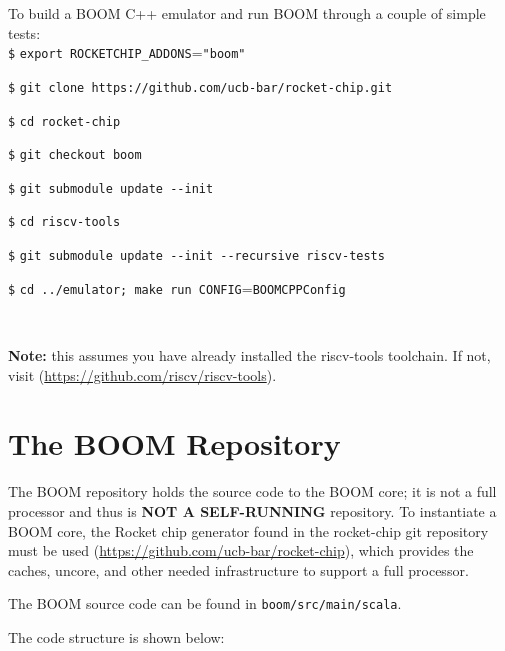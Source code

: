To build a BOOM C++ emulator and run BOOM through a couple of simple tests:
\\

\texttt{\$} \verb=export ROCKETCHIP_ADDONS==\verb="boom"=

\texttt{\$} \verb=git clone https://github.com/ucb-bar/rocket-chip.git=

\texttt{\$} \verb=cd rocket-chip=

\texttt{\$} \verb=git checkout boom=

\texttt{\$} \verb=git submodule update --init=

\texttt{\$} \verb=cd riscv-tools=

\texttt{\$} \verb=git submodule update --init --recursive riscv-tests=

\texttt{\$} \verb=cd ../emulator; make run CONFIG==\verb=BOOMCPPConfig=

\

{\bf Note:} this assumes you have already installed the riscv-tools toolchain.  If not, visit (\url{https://github.com/riscv/riscv-tools}).

\section{The BOOM Repository}

The BOOM repository holds the source code to the BOOM core; it is not a full processor and thus is \textbf{NOT A SELF-RUNNING} repository.  To instantiate a BOOM core, the Rocket chip generator found in the rocket-chip git repository must be used (\url{https://github.com/ucb-bar/rocket-chip}), which provides the caches, uncore, and other needed infrastructure to support a full processor.

The BOOM source code can be found in \verb=boom/src/main/scala=.  

The code structure is shown below:

